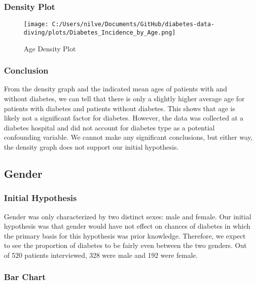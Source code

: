 \documentclass[
]{article}
\begin{document}
\hypertarget{header-n867}{%
\subsubsection{Density Plot}\label{header-n867}}

\begin{figure}
\centering
\texttt{[image: C:/Users/nilve/Documents/GitHub/diabetes-data-diving/plots/Diabetes\_Incidence\_by\_Age.png]}
\caption{Age Density Plot}
\end{figure}

\hypertarget{header-n869}{%
\subsubsection{Conclusion}\label{header-n869}}

From the density graph and the indicated mean ages of patients with and
without diabetes, we can tell that there is only a slightly higher
average age for patients with diabetes and patients without diabetes.
This shows that age is likely not a significant factor for diabetes.
However, the data was collected at a diabetes hospital and did not
account for diabetes type as a potential confounding variable. We cannot
make any significant conclusions, but either way, the density graph does
not support our initial hypothesis.

\hypertarget{header-n871}{%
\subsection{Gender}\label{header-n871}}

\hypertarget{header-n872}{%
\subsubsection{Initial Hypothesis}\label{header-n872}}

Gender was only characterized by two distinct sexes: male and female.
Our initial hypothesis was that gender would have not effect on chances
of diabetes in which the primary basis for this hypothesis was prior
knowledge. Therefore, we expect to see the proportion of diabetes to be
fairly even between the two genders. Out of 520 patients interviewed,
328 were male and 192 were female.

\hypertarget{header-n874}{%
\subsubsection{Bar Chart}\label{header-n874}}
\end{document}
